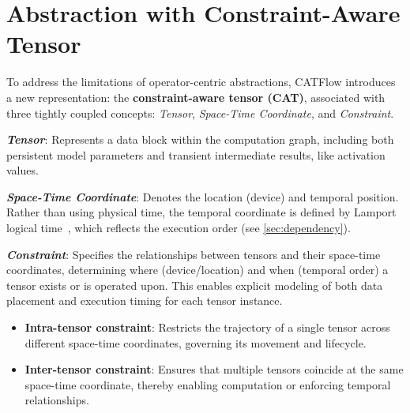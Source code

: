 \documentclass[letterpaper,twocolumn,10pt]{article}
\newcommand{\name}{CATFlow}
\begin{document}
\vspace{-.5em}
\section{Abstraction with Constraint-Aware Tensor}
\label{sec:abstraction}


To address the limitations of operator-centric abstractions, \name{} introduces a new representation: the \textbf{constraint-aware tensor (CAT)}, associated with three tightly coupled concepts: \textit{Tensor}, \textit{Space-Time Coordinate}, and \textit{Constraint}. 

\textbf{\textit{Tensor}}: Represents a data block within the computation graph, including both persistent model parameters and transient intermediate results, like activation values.

\textbf{\textit{Space-Time Coordinate}}: Denotes the location (device) and temporal position. Rather than using physical time, the temporal coordinate is defined by Lamport logical time~\cite{lamport2019time}, which reflects the execution order (see \cref{sec:dependency}).

\textbf{\textit{Constraint}}: Specifies the relationships between tensors and their space-time coordinates, determining where (device/location) and when (temporal order) a tensor exists or is operated upon. This enables explicit modeling of both data placement and execution timing for each tensor instance. 
\vspace{-.35em}
\begin{itemize}
    \item \textbf{Intra-tensor constraint}: Restricts the trajectory of a single tensor across different space-time coordinates, governing its movement and lifecycle.
    \vspace{-.35em}
    \item \textbf{Inter-tensor constraint}: Ensures that multiple tensors coincide at the same space-time coordinate, thereby enabling computation or enforcing temporal relationships.
\end{itemize}
\vspace{-.35em}
\end{document}
